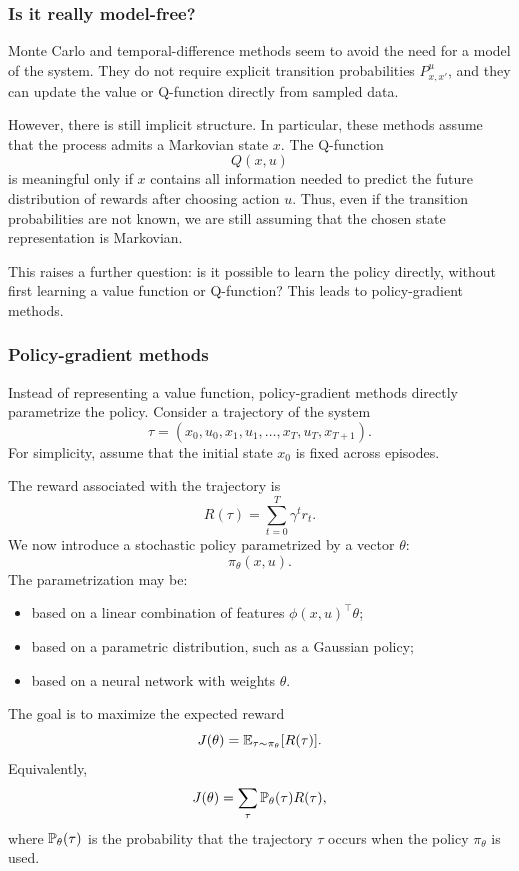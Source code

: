 \subsubsection{Is it really model-free?}

Monte Carlo and temporal-difference methods seem to avoid the need for a model of the
system. They do not require explicit transition probabilities \(P^u_{x,x'}\), and they can update
the value or Q-function directly from sampled data.

However, there is still implicit structure. In particular, these methods assume that the process
admits a Markovian state \(x\). The Q-function
\[
Q(x,u)
\]
is meaningful only if \(x\) contains all information needed to predict the future distribution of
rewards after choosing action \(u\). Thus, even if the transition probabilities are not known, we
are still assuming that the chosen state representation is Markovian.

This raises a further question: is it possible to learn the policy directly, without first learning
a value function or Q-function? This leads to policy-gradient methods.

\subsubsection{Policy-gradient methods}

Instead of representing a value function, policy-gradient methods directly parametrize the
policy. Consider a trajectory of the system
\[
\tau
=
(x_0,u_0,x_1,u_1,\dots,x_T,u_T,x_{T+1}).
\]
For simplicity, assume that the initial state \(x_0\) is fixed across episodes.

The reward associated with the trajectory is
\[
R(\tau)
=
\sum_{t=0}^{T}\gamma^t r_t.
\]
We now introduce a stochastic policy parametrized by a vector \(\theta\):
\[
\pi_\theta(x,u).
\]
The parametrization may be:
\begin{itemize}
    \item based on a linear combination of features \(\phi(x,u)^\top\theta\);
    \item based on a parametric distribution, such as a Gaussian policy;
    \item based on a neural network with weights \(\theta\).
\end{itemize}

The goal is to maximize the expected reward
\[
J(\theta)
=
\mathbb{E}_{\tau\sim\pi_\theta}[R(\tau)].
\]
Equivalently,
\[
J(\theta)
=
\sum_{\tau}\mathbb{P}_\theta(\tau)R(\tau),
\]
where \(\mathbb{P}_\theta(\tau)\) is the probability that the trajectory \(\tau\) occurs when the policy
\(\pi_\theta\) is used.

